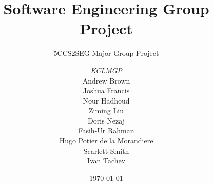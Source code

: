 \documentclass[a4paper, 12pt]{report}
\title{Software Engineering Group Project}
\subtitle{5CCS2SEG Major Group Project}%
\author{\textit{KCLMGP}\\   %
Andrew Brown\\                        %
Joshua Francis\\                        %
Nour Hadhoud\\                      %
Ziming Liu\\                       %
Doris Nezaj\\           
Fasih-Ur Rahman\\                  %
Hugo Potier de la Morandiere\\          %
Scarlett Smith\\                      %
Ivan Tachev\\                      %
}
\date{\today}
\begin{document}
    \maketitle
    \romantableofcontents

    
    
    
    
    
    

    \appendix
\end{document}
